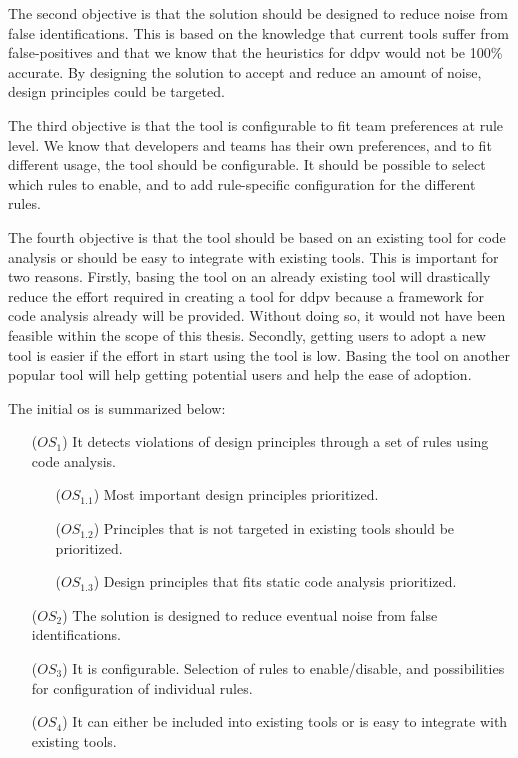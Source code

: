 \documentclass{report}
\begin{document}
The second objective is that the solution should be designed to reduce noise from false identifications. This is based on the knowledge that current tools suffer from false-positives and that we know that the heuristics for \gls{ddpv} would not be 100\% accurate. By designing the solution to accept and reduce an amount of noise, design principles could be targeted.

The third objective is that the tool is configurable to fit team preferences at rule level. We know that developers and teams has their own preferences, and to fit different usage, the tool should be configurable. It should be possible to select which rules to enable, and to add rule-specific configuration for the different rules.

The fourth objective is that the tool should be based on an existing tool for code analysis or should be easy to integrate with existing tools. This is important for two reasons. Firstly, basing the tool on an already existing tool will drastically reduce the effort required in creating a tool for \gls{ddpv} because a framework for code analysis already will be provided. Without doing so, it would not have been feasible within the scope of this thesis. Secondly, getting users to adopt a new tool is easier if the effort in start using the tool is low. Basing the tool on another popular tool will help getting potential users and help the ease of adoption.


The initial \gls{os} is summarized below:
\begin{itemize}
    \item [(\(OS_{1}\))] It detects violations of design principles through a set of rules using code analysis.
    \begin{itemize}
        
        \item [(\(OS_{1.1}\))] Most important design principles prioritized.
        
        \item [(\(OS_{1.2}\))] Principles that is not targeted in existing tools should be prioritized.
        
        \item [(\(OS_{1.3}\))] Design principles that fits static code analysis prioritized.
    \end{itemize}
    \item [(\(OS_{2}\))] The solution is designed to reduce eventual noise from false identifications. 
    
    \item [(\(OS_{3}\))] It is configurable. Selection of rules to enable/disable, and possibilities for configuration of individual rules.  
    
    \item [(\(OS_{4}\))] It can either be included into existing tools or is easy to integrate with existing tools.
\end{itemize}
\end{document}
